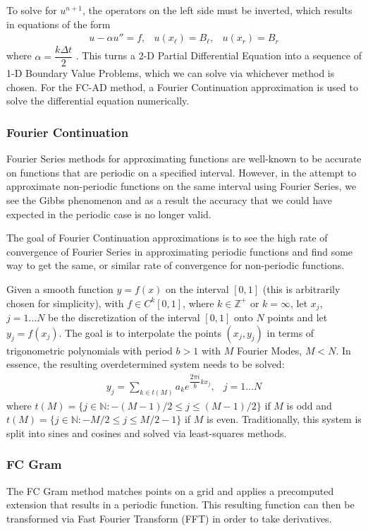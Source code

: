\documentclass[11pt]{amsart}
\begin{document}
To solve for $u^{n+1}$, the operators on the left side must be inverted, which results in equations of the form 
\begin{eqnarray}
u-\alpha u'' = f, & u(x_{\ell})=B_{\ell}, & u(x_r)=B_r 
\end{eqnarray}
where $\alpha=\dfrac{k\Delta t}{2}$ \cite{FCAD1}.  This turns a 2-D Partial Differential Equation into a sequence of 1-D Boundary Value Problems, which we can solve via whichever method is chosen.  For the FC-AD method, a Fourier Continuation approximation is used to solve the differential equation numerically.  

\subsubsection{Fourier Continuation}
Fourier Series methods for approximating functions are well-known to be accurate on functions that are periodic on a specified interval.  However, in the attempt to approximate non-periodic functions on the same interval using Fourier Series, we see the Gibbs phenomenon and as a result the accuracy that we could have expected in the periodic case is no longer valid.  

The goal of Fourier Continuation approximations is to see the high rate of convergence of Fourier Series in approximating periodic functions and find some way to get the same, or similar rate of convergence for non-periodic functions.  

Given a smooth function $y=f(x)$ on the interval $[0,1]$ (this is arbitrarily chosen for simplicity), with $f\in C^k[0,1]$, where $k \in \mathbb{Z}^{+}$ or $k=\infty$, let $x_j$, $j=1 \ldots N$ be the discretization of the interval $[0,1]$ onto $N$ points and let $y_j  = f(x_j)$.  
The goal is to interpolate the points $(x_j,y_j)$ in terms of trigonometric polynomials with period $b>1$ with $M$ Fourier Modes, $M<N$.  
In essence, the resulting overdetermined system needs to be solved:
\begin{eqnarray}
y_j=\sum_{k\in t(M)} a_k e^{\dfrac{2\pi i}{b}kx_j}, &j=1\ldots N
\end{eqnarray}
where $t(M)=\{j\in \mathbb{N}: -(M-1)/2 \leq j \leq (M-1)/2\}$ if $M$ is odd and $t(M)=\{j\in \mathbb{N}: -M/2\leq j \leq M/2-1\}$ if $M$ is even. 
Traditionally, this system is split into sines and cosines and solved via least-squares methods\cite{FC1}.  




\subsubsection{FC Gram}
The FC Gram method matches points on a grid and applies a precomputed extension that results in a periodic function.  This resulting function can then be transformed via Fast Fourier Transform (FFT) in order to take derivatives. 
\end{document}
